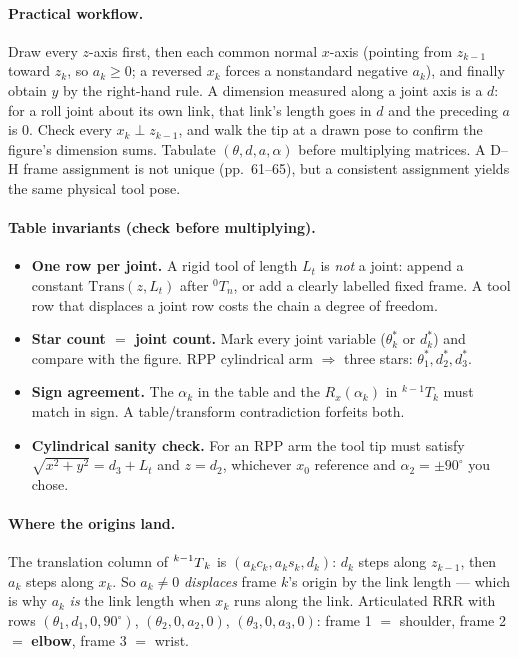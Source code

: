 \documentclass[11pt,a4paper]{article}
\begin{document}
\paragraph{Practical workflow.} Draw every $z$-axis first, then each common normal $x$-axis (pointing from $z_{k-1}$ toward $z_k$, so $a_k\ge0$; a reversed $x_k$ forces a nonstandard negative $a_k$), and finally obtain $y$ by the right-hand rule. A dimension measured along a joint axis is a $d$: for a roll joint about its own link, that link's length goes in $d$ and the preceding $a$ is $0$. Check every $x_k\perp z_{k-1}$, and walk the tip at a drawn pose to confirm the figure's dimension sums. Tabulate $(\theta,d,a,\alpha)$ before multiplying matrices. A D--H frame assignment is not unique (pp.~61--65), but a consistent assignment yields the same physical tool pose.

\paragraph{Table invariants (check before multiplying).}
\begin{itemize}
\item \textbf{One row per joint.} A rigid tool of length $L_t$ is \emph{not} a joint: append a
      constant $\mathrm{Trans}(z,L_t)$ after ${}^0T_n$, or add a clearly labelled fixed frame. A
      tool row that displaces a joint row costs the chain a degree of freedom.
\item \textbf{Star count $=$ joint count.} Mark every joint variable ($\theta_k^\ast$ or
      $d_k^\ast$) and compare with the figure. RPP cylindrical arm $\Rightarrow$ three stars:
      $\theta_1^\ast,d_2^\ast,d_3^\ast$.
\item \textbf{Sign agreement.} The $\alpha_k$ in the table and the $R_x(\alpha_k)$ in
      ${}^{k-1}T_k$ must match in sign. A table/transform contradiction forfeits both.
\item \textbf{Cylindrical sanity check.} For an RPP arm the tool tip must satisfy
      $\sqrt{x^2+y^2}=d_3+L_t$ and $z=d_2$, whichever $x_0$ reference and $\alpha_2=\pm90^\circ$
      you chose.
\end{itemize}

\paragraph{Where the origins land.} The translation column of $\prescript{k-1}{}{T}_{k}$ is
$(a_kc_k,a_ks_k,d_k)$: $d_k$ steps along $z_{k-1}$, then $a_k$ steps along $x_k$. So $a_k\neq0$
\emph{displaces} frame $k$'s origin by the link length --- which is why $a_k$ \emph{is} the link
length when $x_k$ runs along the link. Articulated RRR with rows $(\theta_1,d_1,0,90^\circ)$,
$(\theta_2,0,a_2,0)$, $(\theta_3,0,a_3,0)$: frame 1 $=$ shoulder, frame 2 $=$ \textbf{elbow},
frame 3 $=$ wrist.
\end{document}
